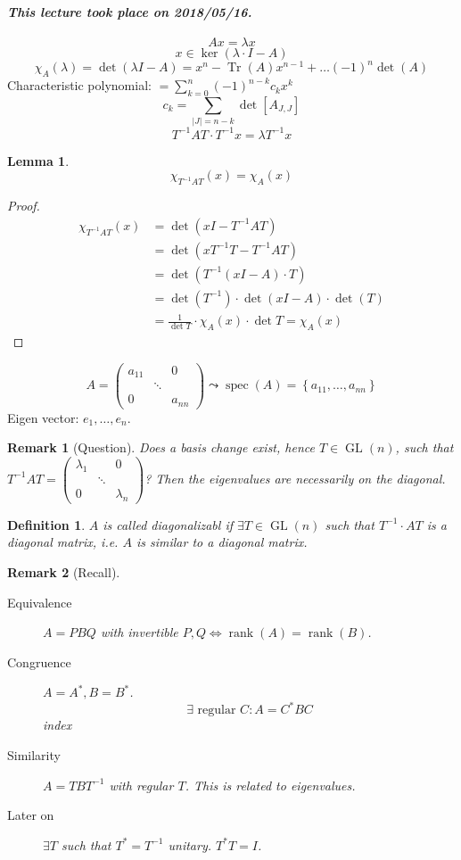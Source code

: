 \documentclass{article}
\newtheorem{definition}{Definition}  \numberwithin{definition}{section}
\newtheorem{lemma}{Lemma}  \numberwithin{lemma}{section}
\newtheorem{remark}{Remark}  \numberwithin{remark}{section}
\newcommand{\set}[1]{\left\{#1\right\}}
\newcommand{\card}[1]{\left|#1\right|}
\newcommand{\dateref}[1]{\paragraph{\textit{This lecture took place on #1.}}}
\DeclareMathOperator{\rank}{rank}
\begin{document}
\dateref{2018/05/16}

\[ Ax = \lambda x \]
\[ x \in \ker(\lambda \cdot I - A) \]
\[ \chi_A(\lambda) = \det(\lambda I - A) = x^n - \operatorname{Tr}(A) x^{n-1} + \dots (-1)^n \det(A) \]
Characteristic polynomial: $= \sum_{k=0}^n (-1)^{n-k} c_k x^k$
\[ c_k = \sum_{\card{J} = n-k} \det[A_{J,J}] \]
\[ T^{-1} AT \cdot T^{-1} x = \lambda T^{-1} x \]

\begin{lemma} %
  \[ \chi_{T^{-1} AT}(x) = \chi_A(x) \]
\end{lemma}
\begin{proof}
  \begin{align*}
    \chi_{T^{-1}AT}(x) &= \det(xI - T^{-1}AT) \\
      &= \det(x T^{-1} T - T^{-1} AT) \\
      &= \det(T^{-1}(xI - A) \cdot T) \\
      &= \det(T^{-1}) \cdot \det(xI - A) \cdot \det(T) \\
      &= \frac{1}{\det{T}} \cdot \chi_A(x) \cdot \det{T} = \chi_A(x)
  \end{align*}
\end{proof}

\[ A = \begin{pmatrix} a_{11} & & 0 \\ & \ddots & \\ 0 & & a_{nn} \end{pmatrix} \leadsto \operatorname{spec}(A) = \set{a_{11}, \dots, a_{nn}} \]
Eigen vector: $e_1, \dots, e_n$.

\begin{remark}[Question]
  Does a basis change exist, hence $T \in \operatorname{GL}(n)$, such that $T^{-1} AT = \begin{pmatrix} \lambda_1 & & 0 \\ & \ddots & \\ 0 &  & \lambda_n \end{pmatrix}$?
  Then the eigenvalues are necessarily on the diagonal.
\end{remark}

\begin{definition} %
  $A$ is called \emph{diagonalizabl} if $\exists T \in \operatorname{GL}(n)$ such that $T^{-1} \cdot AT$ is a diagonal matrix,
  i.e. $A$ is \emph{similar} to a diagonal matrix.
\end{definition}

\begin{remark}[Recall]\hfill{}
  \begin{description}
    \item[Equivalence] $A = PBQ$ with invertible $P,Q \iff \rank(A) = \rank(B)$.
    \item[Congruence]
      $A = A^*, B = B^*$.
      \[ \exists \text{ regular } C: A = C^* BC \]
      index
    \item[Similarity] $A = TBT^{-1}$ with regular $T$. This is related to eigenvalues.
    \item[Later on] $\exists T$ such that $T^* = T^{-1}$ unitary. $T^{*} T = I$.
  \end{description}
\end{remark}
\end{document}
